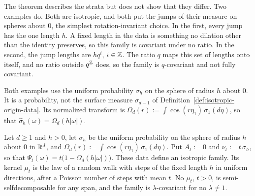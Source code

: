The theorem describes the strata but does not show that they differ. Two examples do. Both are
isotropic, and both put the jumps of their \Levy{} measure on spheres about $0$, the simplest
rotation-invariant choice. In the first, every jump has the one length $h$. A fixed length in the
data is something no dilation other than the identity preserves, so this family is covariant
under no ratio. In the second, the jump lengths are $hq^i$, $i \in \mathbb{Z}$. The ratio $q$ maps this
set of lengths onto itself, and no ratio outside $q^{\mathbb{Z}}$ does, so the family is $q$-covariant
and not fully covariant.

Both examples use the uniform probability $\sigma_h$ on the sphere of radius $h$ about $0$. It is
a probability, not the surface measure $\sigma_{d-1}$ of
Definition~\ref{def:isotropic-origin-data}. Its normalized transform is
$\Omega_d(r) := \int\cos(r\eta_1)\,\sigma_1(d\eta)$, so that
$\widehat\sigma_h(\omega) = \Omega_d(h|\omega|)$.

\begin{proposition}
\label{prop:stratum-one-example}

Let $d \ge 1$ and $h > 0$, let $\sigma_h$ be the uniform probability on the sphere of radius $h$ about
$0$ in $\mathbb{R}^d$, and $\Omega_d(r) := \int\cos(r\eta_1)\,\sigma_1(d\eta)$. Put $A_t := 0$ and
$\nu_t := t\,\sigma_h$, so that $\Psi_t(\omega) = t\bigl(1 - \Omega_d(h|\omega|)\bigr)$. These data
define an isotropic family. Its kernel $\mu_t$ is the law of a random walk with steps of the fixed
length $h$ in uniform directions, after a Poisson number of steps with mean $t$. No $\mu_t$, $t > 0$,
is semi-selfdecomposable for any span, and the family is $\lambda$-covariant for no $\lambda \ne 1$.
\end{proposition}

